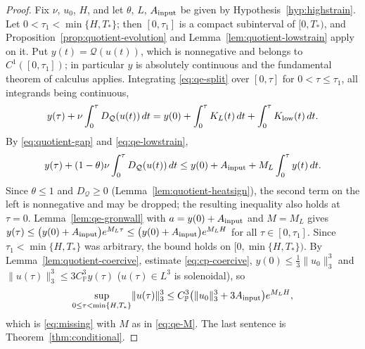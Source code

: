 \documentclass[11pt]{article}
\theoremstyle{definition}
\theoremstyle{plain}
\newcommand{\norm}[1]{\lVert #1\rVert}
\begin{document}
\begin{proof}
Fix $\nu$, $u_0$, $H$, and let $\theta$, $L$, $A_{\rm input}$ be given by
Hypothesis~\ref{hyp:highstrain}.  Let $0<\tau_1<\min\{H,T_*\}$; then
$[0,\tau_1]$ is a compact subinterval of $[0,T_*)$, and
Proposition~\ref{prop:quotient-evolution} and
Lemma~\ref{lem:quotient-lowstrain} apply on it.  Put $y(t)=\mathcal Q(u(t))$,
which is nonnegative and belongs to $C^1([0,\tau_1])$; in particular $y$ is
absolutely continuous and the fundamental theorem of calculus applies.
Integrating \eqref{eq:qe-split} over $[0,\tau]$ for $0<\tau\le\tau_1$, all
integrands being continuous,
\[
 y(\tau)+\nu\int_0^\tau D_{\mathcal Q}(u(t))\,dt
 =y(0)+\int_0^\tau K_L(t)\,dt+\int_0^\tau K_{\rm low}(t)\,dt .
\]
By \eqref{eq:quotient-gap} and \eqref{eq:qe-lowstrain},
\[
 y(\tau)+(1-\theta)\nu\int_0^\tau D_{\mathcal Q}(u(t))\,dt
 \le y(0)+A_{\rm input}+M_L\int_0^\tau y(t)\,dt .
\]
Since $\theta\le1$ and $D_{\mathcal Q}\ge0$
(Lemma~\ref{lem:quotient-heatsign}), the second term on the left is
nonnegative and may be dropped; the resulting inequality also holds at
$\tau=0$.  Lemma~\ref{lem:qe-gronwall} with $a=y(0)+A_{\rm input}$ and
$M=M_L$ gives
$y(\tau)\le\bigl(y(0)+A_{\rm input}\bigr)e^{M_L\tau}\le\bigl(y(0)+A_{\rm input}\bigr)e^{M_LH}$
for all $\tau\in[0,\tau_1]$.  Since $\tau_1<\min\{H,T_*\}$ was arbitrary,
the bound holds on $[0,\min\{H,T_*\})$.  By
Lemma~\ref{lem:quotient-coercive}, estimate \eqref{eq:cp-coercive},
$y(0)\le\frac13\norm{u_0}_3^3$ and
$\norm{u(\tau)}_3^3\le3C_{\mathbb P}^3y(\tau)$ ($u(\tau)\in L^3$ is
solenoidal), so
\[
 \sup_{0\le\tau<\min\{H,T_*\}}\norm{u(\tau)}_3^3
 \le C_{\mathbb P}^3\bigl(\norm{u_0}_3^3+3A_{\rm input}\bigr)e^{M_LH},
\]
which is \eqref{eq:missing} with $M$ as in \eqref{eq:qe-M}.  The last
sentence is Theorem~\ref{thm:conditional}.
\end{proof}
\end{document}
